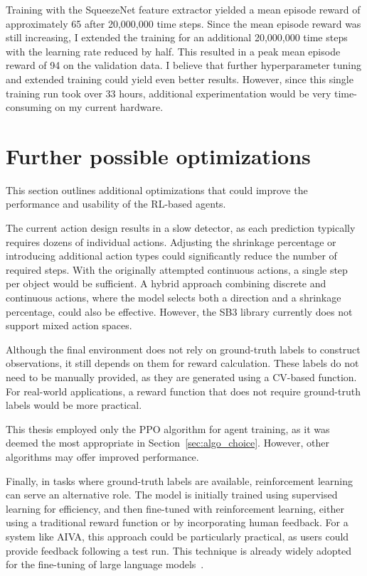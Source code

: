 \documentclass[
  digital,     %
  oneside,     %
  nosansbold,  %
  nocolorbold, %
  lof,         %
  lot,         %
]{fithesis4}
\begin{document}
Training with the SqueezeNet feature extractor yielded a mean episode reward of approximately 65 after 20,000,000 time steps. Since the mean episode reward was still increasing, I extended the training for an additional 20,000,000 time steps with the learning rate reduced by half. This resulted in a peak mean episode reward of 94 on the validation data. I believe that further hyperparameter tuning and extended training could yield even better results. However, since this single training run took over 33 hours, additional experimentation would be very time-consuming on my current hardware.

\section{Further possible optimizations}
\label{sec:further_optim}

This section outlines additional optimizations that could improve the performance and usability of the RL-based agents.

The current action design results in a slow detector, as each prediction typically requires dozens of individual actions. Adjusting the shrinkage percentage or introducing additional action types could significantly reduce the number of required steps. With the originally attempted continuous actions, a single step per object would be sufficient. A hybrid approach combining discrete and continuous actions, where the model selects both a direction and a shrinkage percentage, could also be effective. However, the SB3 library currently does not support mixed action spaces.

Although the final environment does not rely on ground-truth labels to construct observations, it still depends on them for reward calculation. These labels do not need to be manually provided, as they are generated using a CV-based function. For real-world applications, a reward function that does not require ground-truth labels would be more practical.

This thesis employed only the PPO algorithm for agent training, as it was deemed the most appropriate in Section~\ref{sec:algo_choice}. However, other algorithms may offer improved performance.

Finally, in tasks where ground-truth labels are available, reinforcement learning can serve an alternative role. The model is initially trained using supervised learning for efficiency, and then fine-tuned with reinforcement learning, either using a traditional reward function or by incorporating human feedback. For a system like AIVA, this approach could be particularly practical, as users could provide feedback following a test run. This technique is already widely adopted for the fine-tuning of large language models~\cite{LLM-RLHF}.
\end{document}
